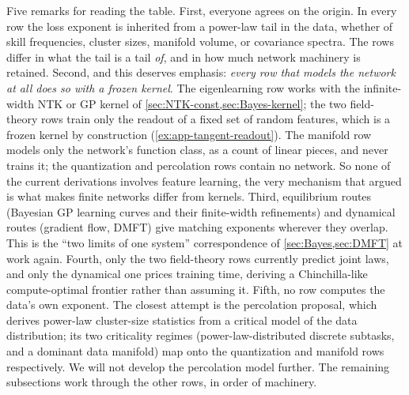 \documentclass[11pt]{article}
\begin{document}
Five remarks for reading the table. First, everyone agrees on the origin. In every row the loss exponent is inherited from a power-law tail in the data, whether of skill frequencies, cluster sizes, manifold volume, or covariance spectra. The rows differ in what the tail is a tail \emph{of}, and in how much network machinery is retained. Second, and this deserves emphasis: \emph{every row that models the network at all does so with a frozen kernel}. The eigenlearning row works with the infinite-width NTK or GP kernel of \cref{sec:NTK-const,sec:Bayes-kernel}; the two field-theory rows train only the readout of a fixed set of random features, which is a frozen kernel by construction (\cref{ex:app-tangent-readout}). The manifold row models only the network's function class, as a count of linear pieces, and never trains it; the quantization and percolation rows contain no network. So none of the current derivations involves feature learning, the very mechanism that  argued is what makes finite networks differ from kernels. Third, equilibrium routes (Bayesian GP learning curves and their finite-width refinements) and dynamical routes (gradient flow, DMFT) give matching exponents wherever they overlap. This is the ``two limits of one system'' correspondence of \cref{sec:Bayes,sec:DMFT} at work again. Fourth, only the two field-theory rows currently predict joint laws, and only the dynamical one prices training time, deriving a Chinchilla-like compute-optimal frontier rather than assuming it. Fifth, no row computes the data's own exponent. The closest attempt is the percolation proposal, which derives power-law cluster-size statistics from a critical model of the data distribution; its two criticality regimes (power-law-distributed discrete subtasks, and a dominant data manifold) map onto the quantization and manifold rows respectively. We will not develop the percolation model further. The remaining subsections work through the other rows, in order of machinery.
\end{document}
